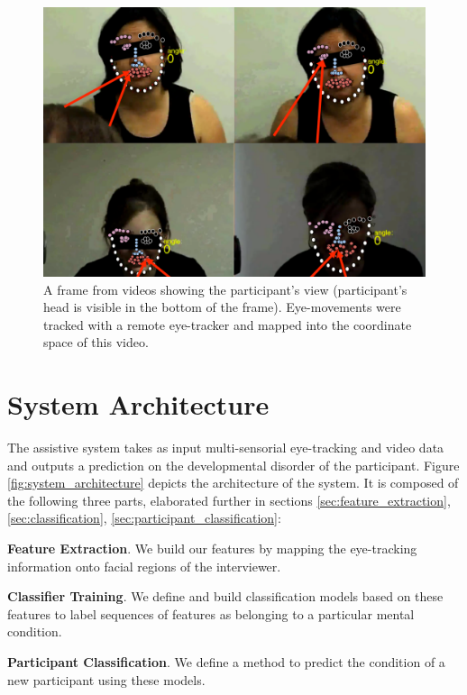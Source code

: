 \documentclass[10pt,twocolumn,letterpaper]{article}
\begin{document}
\begin{figure}[ht]   
 \centering
           \includegraphics[width=0.75\columnwidth]{figures/Real.png}
 \caption{A frame from videos showing the participant's view (participant's head is visible in the bottom of the frame). Eye-movements were tracked with a remote eye-tracker and mapped into the coordinate space of this video.}
\label{fig:environment}
\end{figure}

\section{System Architecture}
The assistive system takes as input multi-sensorial eye-tracking and video data and outputs a prediction on the developmental disorder of the participant. Figure \ref{fig:system_architecture} depicts the architecture of the system. It is composed of the following three parts, elaborated further in sections \ref{sec:feature_extraction}, \ref{sec:classification}, \ref{sec:participant_classification}:

\textbf{Feature Extraction}. We build our features by mapping the eye-tracking information onto facial regions of the interviewer. 

\textbf{Classifier Training}. We define and build classification models based on these features to label sequences of features as belonging to a particular mental condition.  

\textbf{Participant Classification}. We define a method to predict the condition of a new participant using these models. 
\end{document}
